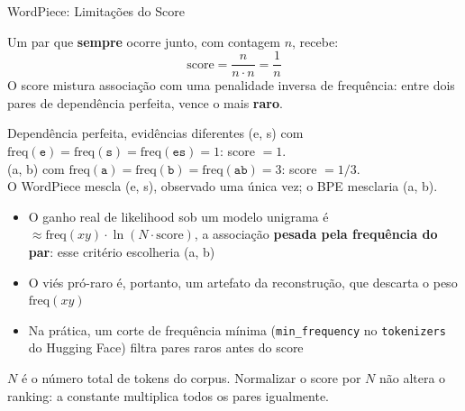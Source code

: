 \documentclass[aspectratio=169,xcolor=dvipsnames]{beamer}
\begin{document}
\begin{frame}[shrink=10]{WordPiece: Limitações do Score}

Um par que \textbf{sempre} ocorre junto, com contagem $n$, recebe:
\vspace{-4pt}
\[
\text{score} = \frac{n}{n \cdot n} = \frac{1}{n}
\]
O score mistura associação com uma penalidade inversa de frequência: entre dois pares de dependência perfeita, vence o mais \textbf{raro}.

\vspace{2pt}

\begin{alertblock}{Dependência perfeita, evidências diferentes}
(e, s) com $\text{freq}(\texttt{e}) = \text{freq}(\texttt{s}) = \text{freq}(\texttt{es}) = 1$: score $= 1$. \\
(a, b) com $\text{freq}(\texttt{a}) = \text{freq}(\texttt{b}) = \text{freq}(\texttt{ab}) = 3$: score $= 1/3$. \\
O WordPiece mescla (e, s), observado uma única vez; o BPE mesclaria (a, b).
\end{alertblock}

\vspace{2pt}

\begin{itemize}
    \item O ganho real de likelihood sob um modelo unigrama é $\approx \text{freq}(xy) \cdot \ln(N \cdot \text{score})$, a associação \textbf{pesada pela frequência do par}: esse critério escolheria (a, b)
    \item O viés pró-raro é, portanto, um artefato da reconstrução, que descarta o peso $\text{freq}(xy)$
    \item Na prática, um corte de frequência mínima (\texttt{min\_frequency} no \texttt{tokenizers} do Hugging Face) filtra pares raros antes do score
\end{itemize}

\vspace{2pt}

{\footnotesize $N$ é o número total de tokens do corpus. Normalizar o score por $N$ não altera o ranking: a constante multiplica todos os pares igualmente.}

\end{frame}

\end{document}
